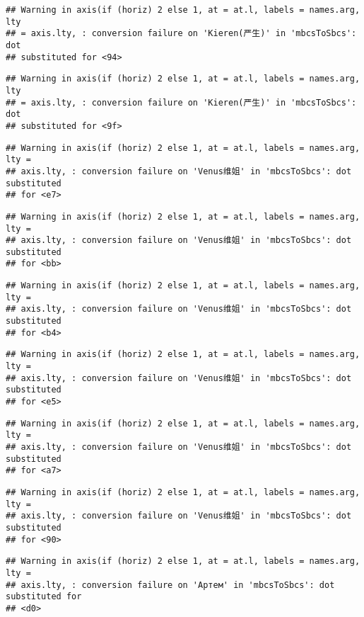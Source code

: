 \documentclass[
]{article}
\begin{document}
\begin{verbatim}
## Warning in axis(if (horiz) 2 else 1, at = at.l, labels = names.arg, lty
## = axis.lty, : conversion failure on 'Kieren(严生)' in 'mbcsToSbcs': dot
## substituted for <94>
\end{verbatim}

\begin{verbatim}
## Warning in axis(if (horiz) 2 else 1, at = at.l, labels = names.arg, lty
## = axis.lty, : conversion failure on 'Kieren(严生)' in 'mbcsToSbcs': dot
## substituted for <9f>
\end{verbatim}

\begin{verbatim}
## Warning in axis(if (horiz) 2 else 1, at = at.l, labels = names.arg, lty =
## axis.lty, : conversion failure on 'Venus维姐' in 'mbcsToSbcs': dot substituted
## for <e7>
\end{verbatim}

\begin{verbatim}
## Warning in axis(if (horiz) 2 else 1, at = at.l, labels = names.arg, lty =
## axis.lty, : conversion failure on 'Venus维姐' in 'mbcsToSbcs': dot substituted
## for <bb>
\end{verbatim}

\begin{verbatim}
## Warning in axis(if (horiz) 2 else 1, at = at.l, labels = names.arg, lty =
## axis.lty, : conversion failure on 'Venus维姐' in 'mbcsToSbcs': dot substituted
## for <b4>
\end{verbatim}

\begin{verbatim}
## Warning in axis(if (horiz) 2 else 1, at = at.l, labels = names.arg, lty =
## axis.lty, : conversion failure on 'Venus维姐' in 'mbcsToSbcs': dot substituted
## for <e5>
\end{verbatim}

\begin{verbatim}
## Warning in axis(if (horiz) 2 else 1, at = at.l, labels = names.arg, lty =
## axis.lty, : conversion failure on 'Venus维姐' in 'mbcsToSbcs': dot substituted
## for <a7>
\end{verbatim}

\begin{verbatim}
## Warning in axis(if (horiz) 2 else 1, at = at.l, labels = names.arg, lty =
## axis.lty, : conversion failure on 'Venus维姐' in 'mbcsToSbcs': dot substituted
## for <90>
\end{verbatim}

\begin{verbatim}
## Warning in axis(if (horiz) 2 else 1, at = at.l, labels = names.arg, lty =
## axis.lty, : conversion failure on 'Артем' in 'mbcsToSbcs': dot substituted for
## <d0>
\end{verbatim}
\end{document}
